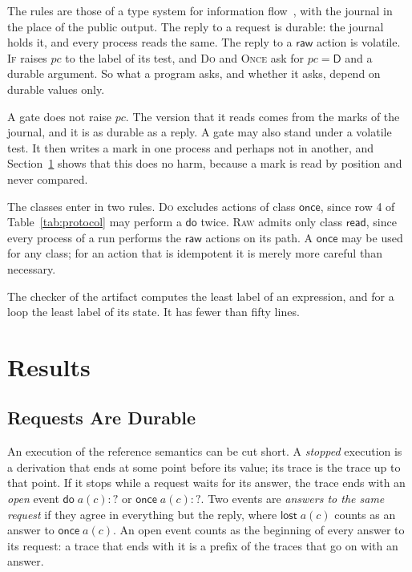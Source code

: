 \documentclass[acmsmall,nonacm,screen]{acmart}
\newcommand{\kw}[1]{\mathsf{#1}}
\newcommand{\D}{\mathsf{D}}
\newcommand{\rd}{\kw{read}}
\newcommand{\onceclass}{\kw{once}}
\begin{document}
The rules are those of a type system for information flow~\citep{volpano1996,sabelfeld2003},
with the journal in the place of the public output. The reply to a request is durable: the
journal holds it, and every process reads the same. The reply to a $\kw{raw}$ action is
volatile. \textsc{If} raises $pc$ to the label of its test, and \textsc{Do} and \textsc{Once}
ask for $pc = \D$ and a durable argument. So what a program asks, and whether it asks, depend
on durable values only.

A gate does not raise $pc$. The version that it reads comes from the marks of the journal,
and it is as durable as a reply. A gate may also stand under a volatile test. It then writes
a mark in one process and perhaps not in another, and Section~\ref{sec:results} shows that
this does no harm, because a mark is read by position and never compared.

The classes enter in two rules. \textsc{Do} excludes actions of class $\onceclass$, since row
4 of Table~\ref{tab:protocol} may perform a $\kw{do}$ twice. \textsc{Raw} admits only class
$\rd$, since every process of a run performs the $\kw{raw}$ actions on its path. A
$\kw{once}$ may be used for any class; for an action that is idempotent it is merely more
careful than necessary.

The checker of the artifact computes the least label of an expression, and for a loop the
least label of its state. It has fewer than fifty lines.

\section{Results}
\label{sec:results}

\subsection{Requests Are Durable}

An execution of the reference semantics can be cut short. A \emph{stopped} execution is a
derivation that ends at some point before its value; its trace is the trace up to that
point. If it stops while a request waits for its answer, the trace ends with an \emph{open}
event $\kw{do}\;a(c){:}{?}$ or $\kw{once}\;a(c){:}{?}$. Two events are \emph{answers to the
same request} if they agree in everything but the reply, where $\kw{lost}\;a(c)$ counts as an
answer to $\kw{once}\;a(c)$. An open event counts as the beginning of every answer to its
request: a trace that ends with it is a prefix of the traces that go on with an answer.
\end{document}
